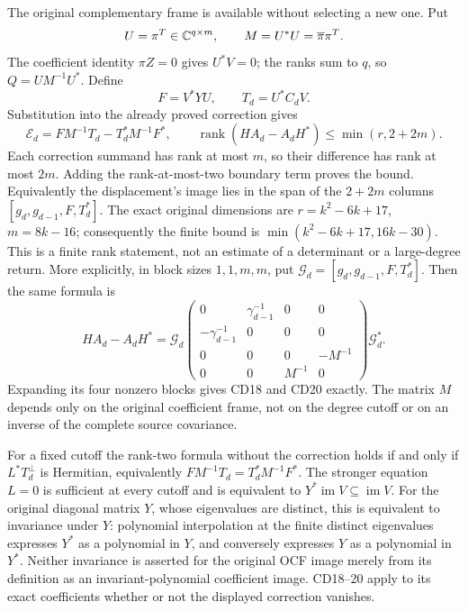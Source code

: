 The original complementary frame is available without selecting a new
one. Put
\[
 U=\pi^T\in\mathbb C^{q\times m},\qquad M=U^*U=\overline\pi\pi^T.
\]
The coefficient identity \(\pi Z=0\) gives \(U^*V=0\); the ranks
sum to \(q\), so \(Q=UM^{-1}U^*\). Define
\[
 F=V^*YU,\qquad T_d=U^*C_dV.
\]
Substitution into the already proved correction gives
\begin{equation}\label{cdroot:eq:actual-complement}
 \boxed{\mathcal E_d=FM^{-1}T_d-T_d^*M^{-1}F^*,
 \qquad
 \operatorname{rank}(HA_d-A_dH^*)\leq\min(r,2+2m).}
 \tag{CD20}
\end{equation}
Each correction summand has rank at most \(m\), so their difference
has rank at most \(2m\). Adding the rank-at-most-two boundary term
proves the bound. Equivalently the displacement's image lies in the
span of the \(2+2m\) columns
\([g_d,g_{d-1},F,T_d^*]\). The exact original dimensions are
\(r=k^2-6k+17\), \(m=8k-16\); consequently the finite bound is
\(\min(k^2-6k+17,16k-30)\). This is a finite rank statement, not an
estimate of a determinant or a large-degree return.
More explicitly, in block sizes \(1,1,m,m\), put
\(\mathcal G_d=[g_d,g_{d-1},F,T_d^*]\). Then the same formula is
\[
 HA_d-A_dH^*=\mathcal G_d
 \begin{pmatrix}
 0&\gamma_{d-1}^{-1}&0&0\\
 -\gamma_{d-1}^{-1}&0&0&0\\
 0&0&0&-M^{-1}\\
 0&0&M^{-1}&0
 \end{pmatrix}\mathcal G_d^*.
\]
Expanding its four nonzero blocks gives CD18 and CD20 exactly. The
matrix \(M\) depends only on the original coefficient frame, not on
the degree cutoff or on an inverse of the complete source covariance.

For a fixed cutoff the rank-two formula without the correction holds
if and only if \(L^*T_d^\perp\) is Hermitian, equivalently
\(FM^{-1}T_d=T_d^*M^{-1}F^*\). The stronger equation \(L=0\) is
sufficient at every cutoff and is equivalent to
\(Y^*\operatorname{im}V\subseteq\operatorname{im}V\).
For the original diagonal matrix \(Y\), whose eigenvalues are distinct,
this is equivalent to invariance under \(Y\): polynomial interpolation
at the finite distinct eigenvalues expresses \(Y^*\) as a polynomial
in \(Y\), and conversely expresses \(Y\) as a polynomial in \(Y^*\).
Neither invariance is asserted for the original OCF image merely from
its definition as an invariant-polynomial coefficient image. CD18--20
apply to its exact coefficients whether or not the displayed correction
vanishes.

